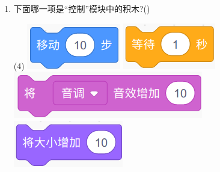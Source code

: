 \documentclass[10pt, a4paper]{article}
\begin{document}
\begin{enumerate}
        \item 下面哪一项是“控制”模块中的积木?(\qquad)
        \begin{tasks}(4)
            \task \includegraphics[width=.1\textwidth]{3a.png}
            \task \includegraphics[width=.1\textwidth]{3b.png}
            \task \includegraphics[width=.18\textwidth]{3c.png}
            \task \includegraphics[width=.12\textwidth]{3d.png}
        \end{tasks}


\end{enumerate}
\end{document}
